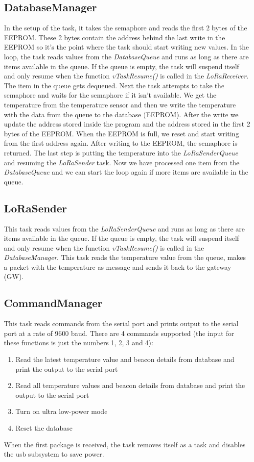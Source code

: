 \documentclass{scrartcl}
\begin{document}
\subsection{DatabaseManager}
In the setup of the task, it takes the semaphore and reads the first 2 bytes of the EEPROM.
These 2 bytes contain the address behind the last write in the EEPROM so it's the point where the task
should start writing new values.
In the loop, the task reads values from the \textit{DatabaseQueue} and runs as long as there are items available in the queue.
If the queue is empty, the task will suspend itself and only resume when the function \textit{vTaskResume()} is called in the \textit{LoRaReceiver}.
The item in the queue gets dequeued. Next the task attempts to take the semaphore and waits for the semaphore if it isn't available.
We get the temperature from the temperature sensor and then we write the temperature with the data from the queue to the database (EEPROM).
After the write we update the address stored inside the program and the address stored in the first 2 bytes of the EEPROM.
When the EEPROM is full, we reset and start writing from the first address again. After writing to the EEPROM, the semaphore is returned.
The last step is putting the temperature into the \textit{LoRaSenderQueue} and resuming the \textit{LoRaSender} task.
Now we have processed one item from the \textit{DatabaseQueue} and we can start the loop again if more items are available in the queue.

\newpage

\subsection{LoRaSender}
This task reads values from the \textit{LoRaSenderQueue} and runs as long as there are items available in the queue.
If the queue is empty, the task will suspend itself and only resume when the function \textit{vTaskResume()} is called in the \textit{DatabaseManager}.
This task reads the temperature value from the queue, makes a packet with the temperature as message and sends it back to the gateway (GW).

\subsection{CommandManager}
This task reads commands from the serial port and prints output to the serial port at a rate of 9600 baud.
There are 4 commands supported (the input for these functions is just the numbers 1, 2, 3 and 4):
\begin{enumerate}
    \item Read the latest temperature value and beacon details from database and print the output to the serial port
    \item Read all temperature values and beacon details from database and print the output to the serial port
    \item Turn on ultra low-power mode
    \item Reset the database
\end{enumerate}
When the first package is received, the task removes itself as a task and disables the usb subsystem to save power.
\end{document}

